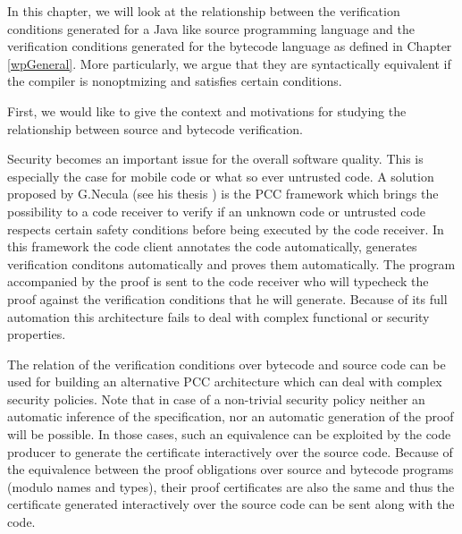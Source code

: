 

In this chapter, we will look at the relationship between
the verification conditions generated for a Java like source programming 
language and the verification conditions generated for the bytecode language 
as defined in Chapter \ref{wpGeneral}. More particularly, we 
argue that they are syntactically equivalent if the compiler is nonoptmizing and satisfies certain 
conditions.
  

First, we would like to give the 
context and motivations for studying the relationship 
between source and bytecode verification.


 Security becomes an important issue for the overall software quality.
This is especially the case for mobile code or what so ever untrusted code. 
A solution  proposed by G.Necula (see his thesis \cite{ComNec}) 
is the PCC framework which brings the possibility to a  code receiver to 
verify if an unknown code  or untrusted code respects certain safety conditions before being executed by the code receiver.
In this framework the code client annotates the code automatically, generates verification conditons automatically
 and proves them automatically.
The  program accompanied by the proof  is sent to the code receiver  who will typecheck the proof against 
the verification conditions that he will generate.
Because of its full automation this architecture fails to deal with complex functional or security properties.


The relation of the verification conditions over bytecode and source code can be used for building an
 alternative PCC architecture which can deal with complex security policies. Note that in case of a non-trivial 
security policy neither an automatic inference of the specification, nor an automatic generation 
of the proof will be possible.
In those cases, such an equivalence can be exploited by the code producer to generate
 the certificate interactively over the source code. Because of the
equivalence between the proof obligations over source and bytecode programs (modulo names and types), 
their  proof certificates are also the same and thus the certificate generated interactively over the
 source code can be sent along with the code.   


